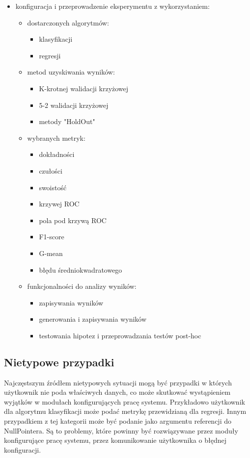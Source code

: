 \documentclass[12pt]{article}
\begin{document}
\begin{itemize}
	\item konfiguracja i przeprowadzenie eksperymentu z wykorzystaniem:
	\begin{itemize}
		\item dostarczonych algorytmów:
		\begin{itemize}
			\item klasyfikacji
			\item regresji		
		\end{itemize}
		\item metod uzyskiwania wyników:
		\begin{itemize}
			\item K-krotnej walidacji krzyżowej
			\item 5-2 walidacji krzyżowej
			\item metody "HoldOut"
		\end{itemize}
		\item wybranych metryk:
		\begin{itemize}
			\item dokładności
			\item czułości
			\item swoistość
			\item krzywej ROC
			\item pola pod krzywą ROC
			\item F1-score
			\item G-mean
			\item błędu średniokwadratowego
		\end{itemize}
		\item funkcjonalności do analizy wyników:
		\begin{itemize}
			\item zapisywania wyników
			\item generowania i zapisywania wyników
			\item testowania hipotez i przeprowadzania testów post-hoc
		\end{itemize}
	\end{itemize}
\end{itemize}

\subsection{Nietypowe przypadki}

Najczęstszym źródłem nietypowych sytuacji mogą być przypadki w których użytkownik nie poda właściwych danych, co może skutkować wystąpieniem wyjątków w modułach konfigurujących pracę systemu. Przykładowo użytkownik dla algorytmu klasyfikacji może podać metrykę przewidzianą dla regresji. Innym przypadkiem z tej kategorii może być podanie jako argumentu referencji do NullPointera. Są to problemy, które powinny być rozwiązywane przez moduły konfigurujące pracę systemu, przez komunikowanie użytkownika o błędnej konfiguracji.
 
\end{document}
